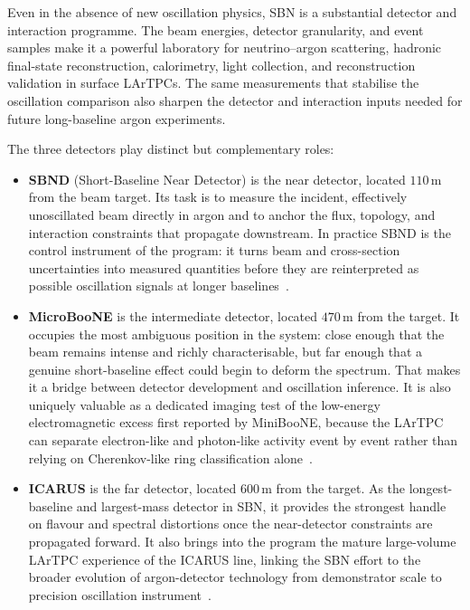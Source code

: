 Even in the absence of new oscillation physics, SBN is a substantial detector
and interaction programme. The beam energies, detector granularity, and event
samples make it a powerful laboratory for neutrino--argon scattering, hadronic
final-state reconstruction, calorimetry, light collection, and reconstruction
validation in surface LArTPCs. The same measurements that stabilise the
oscillation comparison also sharpen the detector and interaction inputs needed
for future long-baseline argon experiments.



The three detectors play distinct but complementary roles:
\begin{itemize}
    \item \textbf{SBND} (Short-Baseline Near Detector) is the near detector,
    located \(110\,\mathrm{m}\) from the beam target. Its task is to measure
    the incident, effectively unoscillated beam directly in argon and to anchor
    the flux, topology, and interaction constraints that propagate downstream.
    In practice SBND is the control instrument of the program: it turns beam
    and cross-section uncertainties into measured quantities before they are
    reinterpreted as possible oscillation signals at longer baselines~\cite{Brailsford:2017rxe}.

    \item \textbf{MicroBooNE} is the intermediate detector, located
    \(470\,\mathrm{m}\) from the target. It occupies the most ambiguous
    position in the system: close enough that the beam remains intense and
    richly characterisable, but far enough that a genuine short-baseline effect
    could begin to deform the spectrum. That makes it a bridge between detector
    development and oscillation inference. It is also uniquely valuable as a
    dedicated imaging test of the low-energy electromagnetic excess first
    reported by MiniBooNE, because the LArTPC can separate electron-like and
    photon-like activity event by event rather than relying on Cherenkov-like
    ring classification alone~\cite{MicroBooNEProposal,MicroBooNEDesign,Acciarri2017Future}.

    \item \textbf{ICARUS} is the far detector, located \(600\,\mathrm{m}\)
    from the target. As the longest-baseline and largest-mass detector in SBN,
    it provides the strongest handle on flavour and spectral distortions once
    the near-detector constraints are propagated forward. It also brings into
    the program the mature large-volume LArTPC experience of the ICARUS line,
    linking the SBN effort to the broader evolution of argon-detector
    technology from demonstrator scale to precision oscillation instrument~\cite{Amerio2004,ICARUSPurity}.
\end{itemize}


